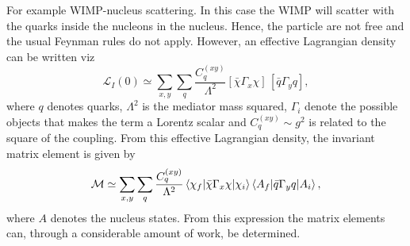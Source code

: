 \begin{example}
	For example WIMP-nucleus scattering. In this case the WIMP will scatter with the quarks inside the nucleons in the nucleus. Hence, the particle are not free and the usual Feynman rules do not apply. However, an effective Lagrangian density can be written viz
	\begin{equation}
		\mathcal{L}_I(0)\simeq \sum_{x,y}\sum_q \frac{C_q^{(xy)}}{\Lambda^2} [\bar{\chi}\Gamma_x\chi]\,[\bar{q}\Gamma_yq],
	\end{equation} 
	where $q$ denotes quarks, $\Lambda^2$ is the mediator mass squared, $\Gamma_i$ denote the possible objects that makes the term a Lorentz scalar and $C_q^{(xy)}\sim g^2$ is related to the square of the coupling. From this effective Lagrangian density, the invariant matrix element is given by
	\begin{equation}
		\mathcal{M}\simeq \sum_{x,y}\sum_q\frac{C_q^{(xy)}}{\Lambda^2} \braket{\chi_f|\bar{\chi}\Gamma_x\chi|\chi_i}\braket{A_f|\bar{q}\Gamma_yq|A_i},
	\end{equation} 
	where $A$ denotes the nucleus states. From this expression the matrix elements can, through a considerable amount of work, be determined.
	
\end{example}
